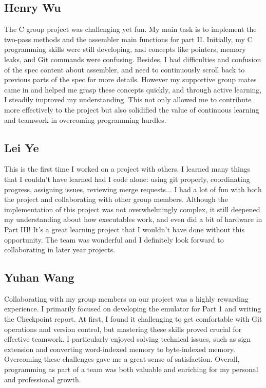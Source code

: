 \documentclass[11pt]{article}
\begin{document}
\subsection{Henry Wu}
The C group project was challenging yet fun. My main task is to implement the
two-pass methods and the assembler main functions for part II. Initially, my C
programming skills were still developing, and concepts like pointers, memory
leaks, and Git commands were confusing. Besides, I had difficulties and
confusion of the spec content about assembler, and need to continuously scroll
back to previous parts of the spec for more details. However my supportive
group mates came in and helped me grasp these concepts quickly, and through
active learning, I steadily improved my understanding. This not only allowed me
to contribute more effectively to the project but also solidified the value of
continuous learning and teamwork in overcoming programming hurdles.

\subsection{Lei Ye}

This is the first time I worked on a project with others. I learned many things
that I couldn't have learned had I code alone: using git properly, coordinating
progress, assigning issues, reviewing merge requests... I had a lot of fun with
both the project and collaborating with other group members. Although the
implementation of this project was not overwhelmingly complex, it still
deepened my understanding about how executables work, and even did a bit of
hardware in Part III! It's a great learning project that I wouldn't have done
without this opportunity. The team was wonderful and I definitely look forward
to collaborating in later year projects.

\subsection{Yuhan Wang}
Collaborating with my group members on our project was a highly rewarding
experience. I primarily focused on developing the emulator for Part 1 and
writing the Checkpoint report. At first, I found it challenging to get
comfortable with Git operations and version control, but mastering these skills
proved crucial for effective teamwork. I particularly enjoyed solving technical
issues, such as sign extension and converting word-indexed memory to
byte-indexed memory. Overcoming these challenges gave me a great sense of
satisfaction. Overall, programming as part of a team was both valuable and
enriching for my personal and professional growth.
\end{document}
